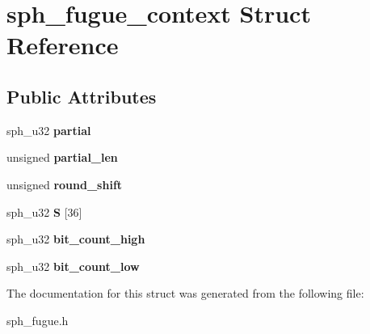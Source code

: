 \hypertarget{structsph__fugue__context}{}\section{sph\+\_\+fugue\+\_\+context Struct Reference}
\label{structsph__fugue__context}
\subsection*{Public Attributes}
\begin{DoxyCompactItemize}
\item 
\mbox{\label{structsph__fugue__context_ac2376b224565b7f8ba5ac3f44a610073}} 
sph\+\_\+u32 {\bfseries partial}
\item 
\mbox{\label{structsph__fugue__context_a9e39b033b9ce03fc86b39438891fd39b}} 
unsigned {\bfseries partial\+\_\+len}
\item 
\mbox{\label{structsph__fugue__context_aba5f9b3ec6500d9dea35840536c98674}} 
unsigned {\bfseries round\+\_\+shift}
\item 
\mbox{\label{structsph__fugue__context_a04633ca61fcf330cea60d25d06edec62}} 
sph\+\_\+u32 {\bfseries S} \mbox{[}36\mbox{]}
\item 
\mbox{\label{structsph__fugue__context_ac5bfc330fd0f8689ca2a172ef7a32340}} 
sph\+\_\+u32 {\bfseries bit\+\_\+count\+\_\+high}
\item 
\mbox{\label{structsph__fugue__context_ab42151f424c51cbce42ceae8d021b0fa}} 
sph\+\_\+u32 {\bfseries bit\+\_\+count\+\_\+low}
\end{DoxyCompactItemize}


The documentation for this struct was generated from the following file\+:\begin{DoxyCompactItemize}
\item 
sph\+\_\+fugue.\+h\end{DoxyCompactItemize}
